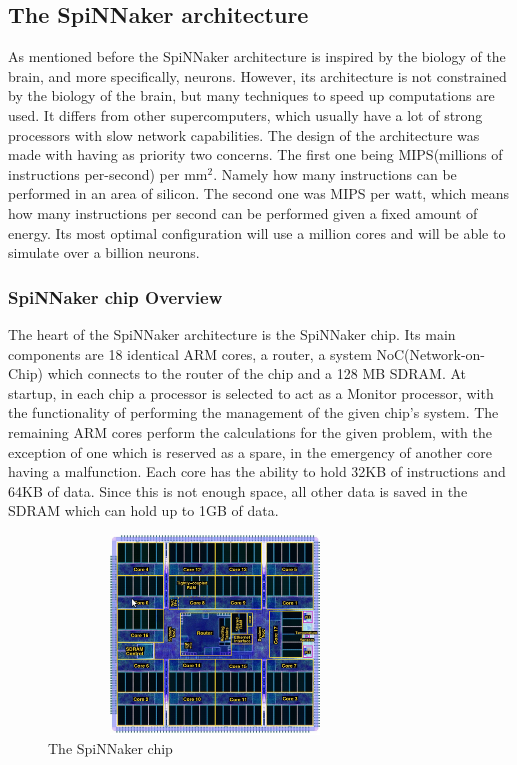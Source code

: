 \documentclass[12pt,a4paper]{article}
\begin{document}
\subsection{The SpiNNaker architecture}
As mentioned before the SpiNNaker architecture is inspired by the biology of the brain, and more specifically, neurons. However, its architecture is not constrained by the biology of the brain, but many techniques to speed up computations are used. It differs from other supercomputers, which  usually have a lot of strong processors with slow network capabilities. The design of the architecture was made with having as priority two concerns. The first one being MIPS(millions of instructions per-second) per mm$^2$. Namely how many instructions can be performed in an area of silicon. The second one was MIPS per watt, which means how many instructions per second can be performed given a fixed amount of energy. Its most optimal configuration will use a million cores and will be able to simulate over a billion neurons\cite{furber2007neural}.
\subsubsection {SpiNNaker chip Overview}
The heart of the SpiNNaker architecture is the SpiNNaker chip. Its main components are 18 identical ARM cores, a router, a system NoC(Network-on-Chip) which connects to the router of the chip and a 128 MB SDRAM. At startup, in each chip a processor is selected to act as a Monitor processor, with the functionality of performing the management of the given chip's system. The remaining ARM cores perform the calculations for the given problem, with the exception of one which is reserved as a spare, in the emergency of another core having a malfunction\cite{furber2007neural}. Each core has the ability to hold 32KB of instructions and 64KB of data. Since this is not enough space, all other data is saved in the SDRAM which can hold up to 1GB of data\cite{navaridas2009understanding}.
\begin{figure}[h!]
\includegraphics[width=250pt,height=150pt,scale=2]{Pics/chip.png}
\centering
\caption{The SpiNNaker chip\cite{spinnweb}}
\end{figure}
\end{document}
